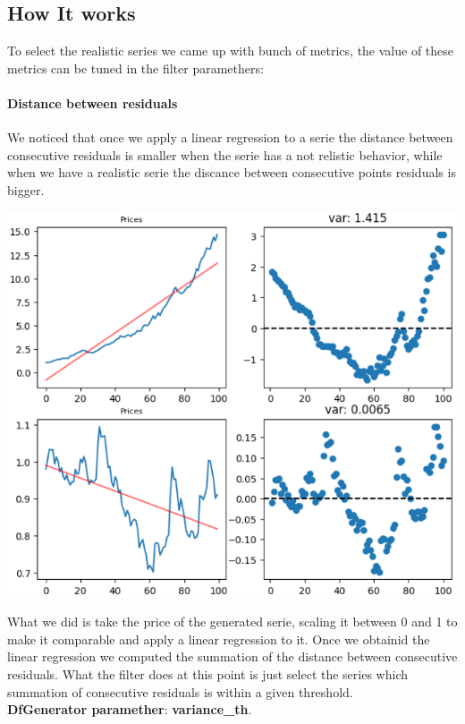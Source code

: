 \documentclass{article}
\begin{document}
\begin{multicols}{2}
    \section*{How It works}
    To select the realistic series we came up with bunch of metrics, the value of these metrics can be tuned in the filter paramethers:
    \paragraph*{Distance between residuals}
    We noticed that once we apply a linear regression to a serie the distance between consecutive residuals is smaller when the serie has a not relistic behavior, 
    while when we have a realistic serie the discance between consecutive points residuals is bigger.
    \begin{center}
        \includegraphics[scale=0.6]{imgs/2_res.png}
    \end{center}
    What we did is take the price of the generated serie, scaling it between 0 and 1 to make it comparable and apply a linear regression to it. Once we obtainid the linear regression we computed the summation of the distance between consecutive residuals. 
    What the filter does at this point is just select the series which summation of consecutive residuals is within a given threshold.\\
    \textbf{DfGenerator paramether}:  \textbf{variance\_th}.

\end{multicols}
\end{document}
